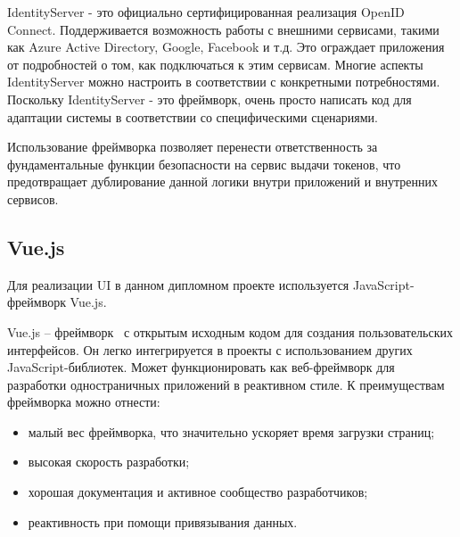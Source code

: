 IdentityServer - это официально сертифицированная реализация OpenID Connect. Поддерживается возможность работы с внешними сервисами, такими как Azure Active Directory, Google, Facebook и т.д. Это ограждает приложения от подробностей о том, как подключаться к этим сервисам. Многие аспекты IdentityServer можно настроить в соответствии с конкретными потребностями. Поскольку IdentityServer - это фреймворк, очень просто написать код для адаптации системы в соответствии со специфическими сценариями. 

Использование фреймворка позволяет перенести ответственность за фундаментальные функции безопасности на сервис выдачи токенов, что предотвращает дублирование данной логики внутри приложений и внутренних сервисов.


\subsection{Vue.js}

Для реализации UI в данном дипломном проекте используется JavaScript-фреймворк Vue.js.

Vue.js – фреймворк~\cite{wiki_vue} с открытым исходным кодом для создания пользовательских интерфейсов. Он легко интегрируется в проекты с использованием других JavaScript-библиотек. Может функционировать как веб-фреймворк для разработки одностраничных приложений в реактивном стиле. К преимуществам фреймворка можно отнести:
\begin{itemize}
    \item малый вес фреймворка, что значительно ускоряет время загрузки страниц;
    \item высокая скорость разработки;
    \item хорошая документация и активное сообщество разработчиков;
    \item реактивность при помощи привязывания данных.
\end{itemize}

